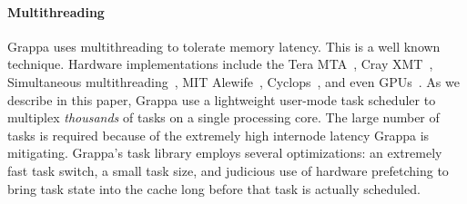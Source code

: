 
\paragraph{Multithreading} Grappa uses multithreading to tolerate
memory latency. This is a well known technique. Hardware
implementations include the Tera MTA~\cite{tera:mta1}, Cray
XMT~\cite{feo:xmt}, Simultaneous multithreading~\cite{tullsen:smt},
MIT Alewife~\cite{agarwal:alewife}, Cyclops~\cite{almasi:cyclops}, and
even GPUs~\cite{gpus}. As we describe in this paper, Grappa use a
lightweight user-mode task scheduler to multiplex \emph{thousands\/} of
tasks on a single processing core. The large number of tasks is
required because of the extremely high internode latency Grappa is
mitigating.  Grappa's task library employs several optimizations: an
extremely fast task switch, a small task size, and judicious use of
hardware prefetching to bring task state into the cache long before
that task is actually scheduled.


